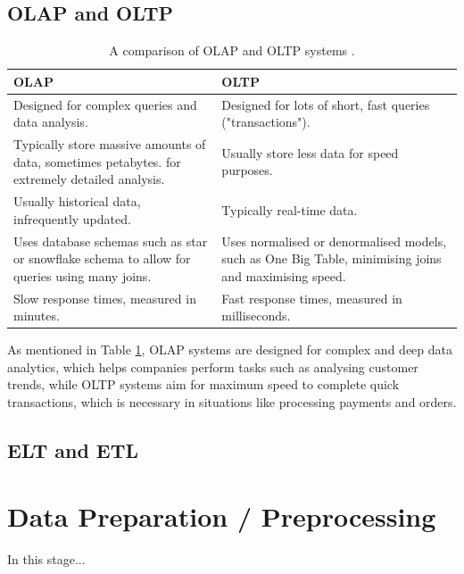 \documentclass[12pt]{report}
\begin{document}
\subsection{OLAP and OLTP}

\begin{table}[H]
    \centering
        \begin{tabular}{ |p{}| p{}|}
            \hline
            \cellcolor{blue!25}OLAP & \cellcolor{blue!25}OLTP\\
            \hline
            Designed for complex queries and data analysis.
            & Designed for lots of short, fast queries ("transactions").\\
            \hline
            Typically store massive amounts of data, sometimes petabytes.
            for extremely detailed analysis. 
            & Usually store less data for speed purposes.\\
            \hline
            Usually historical data, infrequently updated. 
            & Typically real-time data.\\
            \hline 
            Uses database schemas such as star or snowflake schema to allow for queries using many joins. 
            & Uses normalised or denormalised models, such as One Big Table, minimising joins and maximising speed.\\
            \hline
            Slow response times, measured in minutes. 
            & Fast response times, measured in milliseconds.\\
            \hline
    \end{tabular}
    \caption{A comparison of OLAP and OLTP systems \autocite{aws_oltp_nodate}.}\label{tab:OLAP-OLTP}
\end{table}

As mentioned in Table \ref{tab:OLAP-OLTP}, OLAP systems are designed for complex and deep data analytics, which helps 
companies perform tasks such as analysing customer trends, while OLTP systems aim for maximum speed to complete quick transactions, 
which is necessary in situations like processing payments and orders.

\subsection{ELT and ETL}


\section{Data Preparation / Preprocessing}
In this stage...
\end{document}
